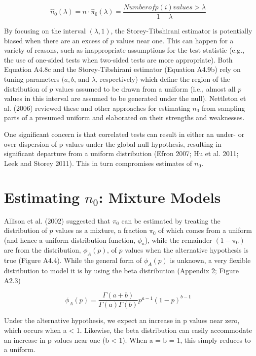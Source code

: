 \documentclass{article}
\begin{document}
\begin{equation}
\widehat{n}_{0}(\lambda)=n\cdot\widehat{\pi}_{0}(\lambda)=\frac{Number of p(i)values>\lambda}{1-\lambda}
\end{equation}

By focusing on the interval $(\lambda, 1)$, the Storey-Tibshirani estimator is potentially biased when there are an excess of $p$ values near one. This can happen for a variety of reasons, such as inappropriate assumptions for the test statistic (e.g., the use of one-sided tests when two-sided tests are more appropriate). Both Equation A4.8c and the Storey-Tibshirani estimator (Equation A4.9b) rely on tuning parameters $(a, b$, and $\lambda$, respectively) which define the region of the distribution of $p$ values assumed to be drawn from a uniform (i.e., almost all $p$ values in this interval are assumed to be generated under the null). Nettleton et al. (2006) reviewed these and other approaches for estimating $n_{0}$ from sampling parts of a presumed uniform and elaborated on their strengths and weaknesses.

One significant concern is that correlated tests can result in either an under- or over-dispersion of p values under the global null hypothesis, resulting in significant departure from a uniform distribution (Efron 2007; Hu et al. 2011; Leek and Storey 2011). This in turn compromises estimates of  $ n_{0} $.

\section{Estimating  $ n_{0} $: Mixture Models}
Allison et al. (2002) suggested that  $ \pi_0 $ can be estimated by treating the distribution of  $ p $ values as a mixture, a fraction  $ \pi_0 $ of which comes from a uniform (and hence a uniform distribution function,  $ \phi_u $), while the remainder  $ (1 - \pi_0) $ are from the distribution,  $ \phi_A(p) $, of  $ p $ values when the alternative hypothesis is true (Figure A4.4). While the general form of  $ \phi_A(p) $ is unknown, a very flexible distribution to model it is by using the beta distribution (Appendix 2; Figure A2.3)

\begin{equation}
\phi_{A}(p)=\frac{\Gamma(a+b)}{\Gamma(a)\Gamma(b)}p^{a-1}(1-p)^{b-1}
\end{equation}

Under the alternative hypothesis, we expect an increase in p values near zero, which occurs when a < 1. Likewise, the beta distribution can easily accommodate an increase in p values near one (b < 1). When a = b = 1, this simply reduces to a uniform.
\end{document}
